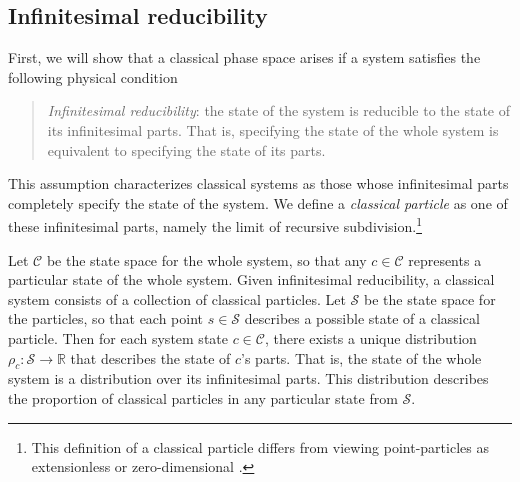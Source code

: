 \documentclass[12pt, twoside]{article}
\newcommand\bs{\begin{singlespace}}
\newcommand\es{\end{singlespace}}
\begin{document}

\subsection{Infinitesimal reducibility}
\label{infinitesimal}

First, we will show that a classical phase space arises if a system satisfies the following physical condition 

\begin{quotation}
\bs \noindent
\textit{Infinitesimal reducibility}: the state of the system is reducible to the state of its infinitesimal parts. That is, specifying the state of the whole system is equivalent to specifying the state of its parts.
\es
\end{quotation}


\noindent
This assumption characterizes classical systems as those whose infinitesimal parts completely specify the state of the system. We define a \textit{classical particle} as one of these infinitesimal parts, namely the limit of recursive subdivision.\footnote{This definition of a classical particle differs from viewing point-particles as extensionless \parencites[]{Butterfieldpoints} or zero-dimensional \parencites[]{Wilson}.}

Let $\mathcal{C}$ be the state space for the whole system, so that any $c \in \mathcal{C}$ represents a particular state of the whole system. Given infinitesimal reducibility, a classical system consists of a collection of classical particles. Let $\mathcal{S}$ be the state space for the particles, so that each point $s \in \mathcal{S}$ describes a possible state of a classical particle. Then for each system state $c \in \mathcal{C}$, there exists a unique distribution $\rho_c : \mathcal{S} \to \mathbb{R} $ that describes the state of $c$'s parts. That is, the state of the whole system is a distribution over its infinitesimal parts. This distribution describes the proportion of classical particles in any particular state from $\mathcal{S}$.
\end{document}
